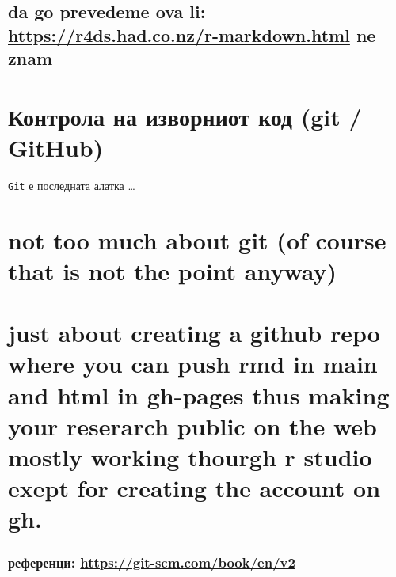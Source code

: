 \documentclass[
]{book}
\begin{document}
\hypertarget{da-go-prevedeme-ova-li-httpsr4ds.had.co.nzr-markdown.html-ne-znam}{%
\section{\texorpdfstring{da go prevedeme ova li: \url{https://r4ds.had.co.nz/r-markdown.html} ne znam}{da go prevedeme ova li: https://r4ds.had.co.nz/r-markdown.html ne znam}}\label{da-go-prevedeme-ova-li-httpsr4ds.had.co.nzr-markdown.html-ne-znam}}

\hypertarget{ux43aux43eux43dux442ux440ux43eux43bux430-ux43dux430-ux438ux437ux432ux43eux440ux43dux438ux43eux442-ux43aux43eux434-git-github}{%
\chapter{Контрола на изворниот код (git / GitHub)}\label{ux43aux43eux43dux442ux440ux43eux43bux430-ux43dux430-ux438ux437ux432ux43eux440ux43dux438ux43eux442-ux43aux43eux434-git-github}}

\texttt{Git} е последната алатка
\ldots{}

\hypertarget{not-too-much-about-git-of-course-that-is-not-the-point-anyway}{%
\chapter{not too much about git (of course that is not the point anyway)}\label{not-too-much-about-git-of-course-that-is-not-the-point-anyway}}

\hypertarget{just-about-creating-a-github-repo-where-you-can-push-rmd-in-main-and-html-in-gh-pages-thus-making-your-reserarch-public-on-the-web-mostly-working-thourgh-r-studio-exept-for-creating-the-account-on-gh.}{%
\chapter{just about creating a github repo where you can push rmd in main and html in gh-pages thus making your reserarch public on the web mostly working thourgh r studio exept for creating the account on gh.}\label{just-about-creating-a-github-repo-where-you-can-push-rmd-in-main-and-html-in-gh-pages-thus-making-your-reserarch-public-on-the-web-mostly-working-thourgh-r-studio-exept-for-creating-the-account-on-gh.}}

\hypertarget{ux440ux435ux444ux435ux440ux435ux43dux446ux438-httpsgit-scm.combookenv2}{%
\subsection{\texorpdfstring{референци: \url{https://git-scm.com/book/en/v2}}{референци: https://git-scm.com/book/en/v2}}\label{ux440ux435ux444ux435ux440ux435ux43dux446ux438-httpsgit-scm.combookenv2}}

  
\end{document}

